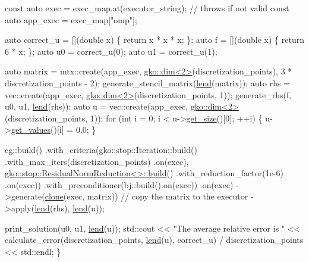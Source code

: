 \begin{DoxyCodeInclude}
    \textcolor{keyword}{const} \textcolor{keyword}{auto} exec = exec\_map.at(executor\_string);  \textcolor{comment}{// throws if not valid}
    \textcolor{keyword}{const} \textcolor{keyword}{auto} app\_exec = exec\_map[\textcolor{stringliteral}{"omp"}];

    \textcolor{keyword}{auto} correct\_u = [](\textcolor{keywordtype}{double} x) \{ \textcolor{keywordflow}{return} x * x * x; \};
    \textcolor{keyword}{auto} f = [](\textcolor{keywordtype}{double} x) \{ \textcolor{keywordflow}{return} 6 * x; \};
    \textcolor{keyword}{auto} u0 = correct\_u(0);
    \textcolor{keyword}{auto} u1 = correct\_u(1);

    \textcolor{keyword}{auto} matrix = mtx::create(app\_exec, \hyperlink{structgko_1_1dim}{gko::dim<2>}(discretization\_points),
                              3 * discretization\_points - 2);
    generate\_stencil\_matrix(\hyperlink{namespacegko_aa8cb4876b72e5e1036ea9575443c439b}{lend}(matrix));
    \textcolor{keyword}{auto} rhs = vec::create(app\_exec, \hyperlink{structgko_1_1dim}{gko::dim<2>}(discretization\_points, 1));
    generate\_rhs(f, u0, u1, \hyperlink{namespacegko_aa8cb4876b72e5e1036ea9575443c439b}{lend}(rhs));
    \textcolor{keyword}{auto} u = vec::create(app\_exec, \hyperlink{structgko_1_1dim}{gko::dim<2>}(discretization\_points, 1));
    \textcolor{keywordflow}{for} (\textcolor{keywordtype}{int} i = 0; i < u->\hyperlink{classgko_1_1LinOp_a31b3c003388eb0b95393154f68c2b98d}{get\_size}()[0]; ++i) \{
        u->\hyperlink{classgko_1_1matrix_1_1Dense_a3bc458e02fab8e4c9f60f70bd4d5a4f9}{get\_values}()[i] = 0.0;
    \}

    cg::build()
        .with\_criteria(gko::stop::Iteration::build()
                           .with\_max\_iters(discretization\_points)
                           .on(exec),
                       \hyperlink{classgko_1_1stop_1_1ResidualNormReduction}{gko::stop::ResidualNormReduction<>::build}()
                           .with\_reduction\_factor(1e-6)
                           .on(exec))
        .with\_preconditioner(bj::build().on(exec))
        .on(exec)
        ->generate(\hyperlink{namespacegko_a1beb80750459e4201aa9d882d2d074c3}{clone}(exec, matrix))  \textcolor{comment}{// copy the matrix to the executor}
        ->apply(\hyperlink{namespacegko_aa8cb4876b72e5e1036ea9575443c439b}{lend}(rhs), \hyperlink{namespacegko_aa8cb4876b72e5e1036ea9575443c439b}{lend}(u));

    print\_solution(u0, u1, \hyperlink{namespacegko_aa8cb4876b72e5e1036ea9575443c439b}{lend}(u));
    std::cout << \textcolor{stringliteral}{"The average relative error is "}
              << calculate\_error(discretization\_points, \hyperlink{namespacegko_aa8cb4876b72e5e1036ea9575443c439b}{lend}(u), correct\_u) /
                     discretization\_points
              << std::endl;
\}
\end{DoxyCodeInclude}
 